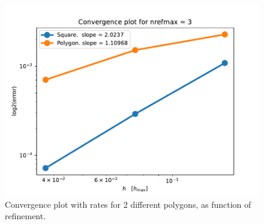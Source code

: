 \documentclass[aps, 12pt]{revtex4}
\begin{document}
\begin{figure}
    \includegraphics[width=\linewidth]{convplot.pdf}
    \caption{Convergence plot with rates for 2 different polygons, as function of refinement.}
    \label{fig:conv}
\end{figure}
\end{document}
